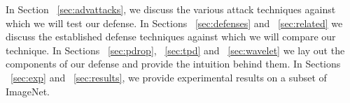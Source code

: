 In Section ~\ref{sec:advattacks}, we discuss the various attack techniques against which we will test our defense.  In Sections ~\ref{sec:defenses} and ~\ref{sec:related} we discuss the established defense techniques against which we will compare our technique.  In Sections ~\ref{sec:pdrop}, ~\ref{sec:tpd} and ~\ref{sec:wavelet} we lay out the components of our defense and provide the intuition behind them.  In Sections ~\ref{sec:exp} and ~\ref{sec:results}, we provide experimental results on a subset of ImageNet.





%
%


